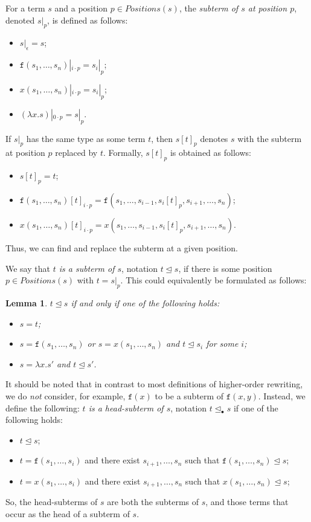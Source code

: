 \documentclass{lmcs}
\theoremstyle{theorem}\newtheorem{theorem}{Theorem}
\theoremstyle{theorem}\newtheorem{lemma}[theorem]{Lemma}
\theoremstyle{theorem}\newtheorem{corollary}[theorem]{Corollary}
\theoremstyle{definition}\newtheorem{definition}[theorem]{Definition}
\theoremstyle{definition}\newtheorem{example}[theorem]{Example}
\newcommand{\Positions}{\mathit{Positions}}
\newcommand{\identifier}[1]{\mathtt{#1}}
\newcommand{\afun}{\identifier{f}}
\newcommand{\avar}{x}
\newcommand{\abs}[2]{\lambda #1.#2}
\newcommand{\subtermeq}{\unlhd}
\newcommand{\headsubtermeq}{\unlhd_{\bullet}}
\begin{document}
For a term $s$ and a position $p \in \Positions(s)$, the \emph{subterm of $s$ at position $p$},
denoted $s|_p$, is defined as follows:
\begin{itemize}
\item $s|_\epsilon = s$;
\item $\afun(s_1,\dots,s_n)|_{i \cdot p} = s_i|_p$;
\item $\avar(s_1,\dots,s_n)|_{i \cdot p} = s_i|_p$;
\item $(\abs{\avar}{s})|_{0 \cdot p} = s|_p$.
\end{itemize}

If $s|_p$ has the same type as some term $t$, then $s[t]_p$ denotes $s$ with the subterm at position
$p$ replaced by $t$.  Formally, $s[t]_p$ is obtained as follows:
\begin{itemize}
\item $s[t]_p = t$;
\item $\afun(s_1,\dots,s_n)[t]_{i \cdot p} = \afun(s_1,\dots,s_{i-1},s_i[t]_p,s_{i+1},\dots,s_n)$;
\item $\avar(s_1,\dots,s_n)[t]_{i \cdot p} = \avar(s_1,\dots,s_{i-1},s_i[t]_p,s_{i+1},\dots,s_n)$.
\end{itemize}
Thus, we can find and replace the subterm at a given position.

We say that \emph{$t$ is a subterm of $s$}, notation $t \subtermeq s$, if there is some position
$p \in \Positions(s)$ with $t = s|_p$.  This could equivalently be formulated as follows:

\begin{lemma}
$t \subtermeq s$ if and only if one of the following holds:
\begin{itemize}
\item $s = t$;
\item $s = \afun(s_1,\dots,s_n)$ or $s = \avar(s_1,\dots,s_n)$ and $t \subtermeq s_i$ for some $i$;
\item $s = \abs{x}{s'}$ and $t \subtermeq s'$.
\end{itemize}
\end{lemma}

It should be noted that in contrast to most definitions of higher-order rewriting, we do \emph{not}
consider, for example, $\afun(x)$ to be a subterm of $\afun(x,y)$.  Instead, we define the
following: \emph{$t$ is a head-subterm of $s$}, notation $t \headsubtermeq s$ if one of the
following holds:
\begin{itemize}
\item $t \subtermeq s$;
\item $t = \afun(s_1,\dots,s_i)$ and there exist $s_{i+1},\dots,s_n$ such that
  $\afun(s_1,\dots,s_n) \subtermeq s$;
\item $t = \avar(s_1,\dots,s_i)$ and there exist $s_{i+1},\dots,s_n$ such that
  $\avar(s_1,\dots,s_n) \subtermeq s$;
\end{itemize}
So, the head-subterms of $s$ are both the subterms of $s$, and those terms that occur as the head
of a subterm of $s$.
\end{document}
